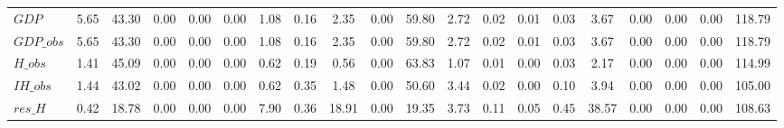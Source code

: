 \begin{center}
\begin{longtable}{lccccccccccccccccccc}
$GDP                        $	 & 	                5.65	 & 	               43.30	 & 	                0.00	 & 	                0.00	 & 	                0.00	 & 	                1.08	 & 	                0.16	 & 	                2.35	 & 	                0.00	 & 	               59.80	 & 	                2.72	 & 	                0.02	 & 	                0.01	 & 	                0.03	 & 	                3.67	 & 	                0.00	 & 	                0.00	 & 	                0.00	 & 	              118.79 \\ 
$GDP\_obs                   $	 & 	                5.65	 & 	               43.30	 & 	                0.00	 & 	                0.00	 & 	                0.00	 & 	                1.08	 & 	                0.16	 & 	                2.35	 & 	                0.00	 & 	               59.80	 & 	                2.72	 & 	                0.02	 & 	                0.01	 & 	                0.03	 & 	                3.67	 & 	                0.00	 & 	                0.00	 & 	                0.00	 & 	              118.79 \\ 
$H\_obs                     $	 & 	                1.41	 & 	               45.09	 & 	                0.00	 & 	                0.00	 & 	                0.00	 & 	                0.62	 & 	                0.19	 & 	                0.56	 & 	                0.00	 & 	               63.83	 & 	                1.07	 & 	                0.01	 & 	                0.00	 & 	                0.03	 & 	                2.17	 & 	                0.00	 & 	                0.00	 & 	                0.00	 & 	              114.99 \\ 
$IH\_obs                    $	 & 	                1.44	 & 	               43.02	 & 	                0.00	 & 	                0.00	 & 	                0.00	 & 	                0.62	 & 	                0.35	 & 	                1.48	 & 	                0.00	 & 	               50.60	 & 	                3.44	 & 	                0.02	 & 	                0.00	 & 	                0.10	 & 	                3.94	 & 	                0.00	 & 	                0.00	 & 	                0.00	 & 	              105.00 \\ 
$res\_H                     $	 & 	                0.42	 & 	               18.78	 & 	                0.00	 & 	                0.00	 & 	                0.00	 & 	                7.90	 & 	                0.36	 & 	               18.91	 & 	                0.00	 & 	               19.35	 & 	                3.73	 & 	                0.11	 & 	                0.05	 & 	                0.45	 & 	               38.57	 & 	                0.00	 & 	                0.00	 & 	                0.00	 & 	              108.63 \\ 

\end{longtable}
\end{center}
